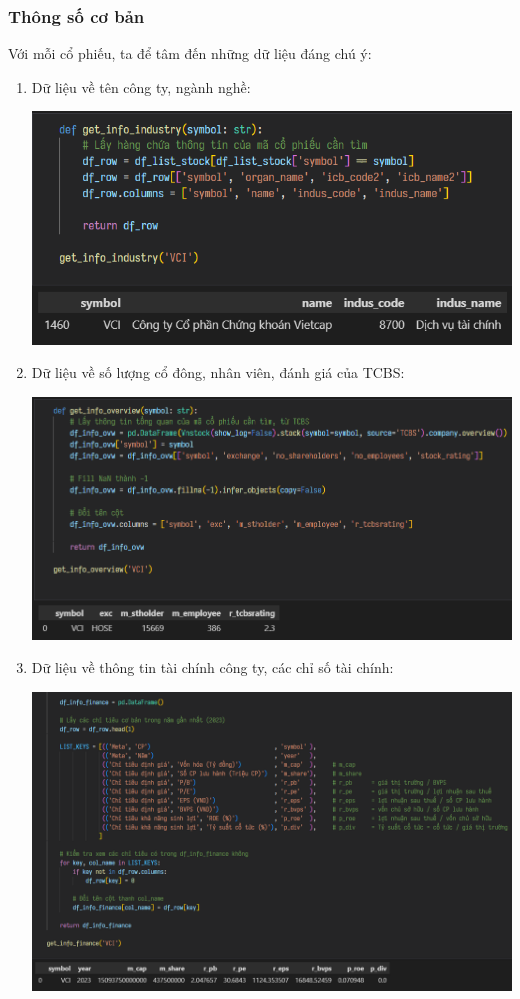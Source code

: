 \subsubsection*{Thông số cơ bản}
Với mỗi cổ phiếu, ta để tâm đến những dữ liệu đáng chú ý:
\begin{enumerate}
    \item Dữ liệu về tên công ty, ngành nghề:
    \begin{center}
        \centering
        \includegraphics[width=0.75\linewidth]{images/code-1.12-crawlstock1.png}
    \end{center}
    \item Dữ liệu về số lượng cổ đông, nhân viên, đánh giá của TCBS:
    \begin{center}
        \centering
        \includegraphics[width=1\linewidth]{images/code-1.13-crawlstock2.png}
    \end{center}
    \item Dữ liệu về thông tin tài chính công ty, các chỉ số tài chính:
    \begin{center}
        \centering
        \includegraphics[width=1\linewidth]{images/code-1.14-crawlstock3.png}
    \end{center}
\end{enumerate}


